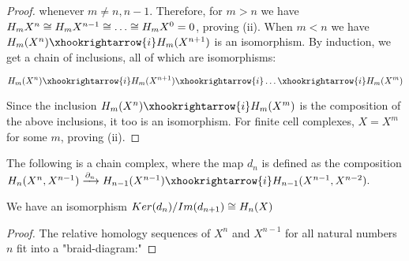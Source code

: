 \begin{definitions}
\begin{proof}
whenever $m\neq n,n-1$. Therefore, for $m>n$ we have $H_m{X^n}\cong H_m{X^{n-1}}\cong \dots \cong H_m{X^0}=0$, proving (ii). When $m<n$ we have $H_m(X^n)\xhookrightarrow{i} H_m(X^{n+1})$ is an isomorphism. By induction, we get a chain of inclusions, all of which are isomorphisms:

$$H_m(X^n)\xhookrightarrow{i} H_m(X^{n+1})\xhookrightarrow{i}\dots \xhookrightarrow{i} H_m(X^{m})$$

Since the inclusion $H_m(X^n)\xhookrightarrow{i} H_m(X^{m})$ is the composition of the above inclusions, it too is an isomorphism. For finite cell complexes, $X=X^m$ for some $m$, proving (ii). 
\end{proof}

\begin{theorem}
The following is a chain complex, where the map $d_n$ is defined as the composition $H_n(X^n,X^{n-1})\xrightarrow{\partial_n}H_{n-1}(X^{n-1})\xhookrightarrow{i} H_{n-1}(X^{n-1},X^{n-2}).$


We have an isomorphism $Ker(d_n)/Im(d_{n+1})  \cong H_n(X)$
\end{theorem}

\begin{proof}
The relative homology sequences of $X^n$ and $X^{n-1}$ for all natural numbers $n$ fit into a "braid-diagram:"


\end{proof}
\end{definitions}
